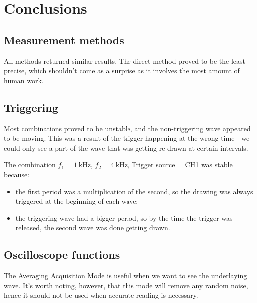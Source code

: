 \section{Conclusions}

\subsection{Measurement methods}


All methods returned similar results. The direct method proved to be the least precise, which shouldn’t come as a surprise as it involves the most amount of human work.

\subsection{Triggering}

Most combinations proved to be unstable, and the non-triggering wave appeared to be moving. This was a result of the trigger happening at the wrong time - we could only see a part of the wave that was getting re-drawn at certain intervals.


The combination $f_{1}=\SI{1}{\kilo\hertz}$, $f_{2} = \SI{4}{\kilo\hertz}$, Trigger source = CH1 was stable because:
\begin{itemize}
	\item the first period was a multiplication of the second, so the drawing was always triggered at the beginning of each wave;
	\item the triggering wave had a bigger period, so by the time the trigger was released, the second wave was done getting drawn.
\end{itemize}

\subsection{Oscilloscope functions}

The Averaging Acquisition Mode is useful when we want to see the underlaying wave. It’s worth noting, however, that this mode will remove any random noise, hence it should not be used when accurate reading is necessary.

